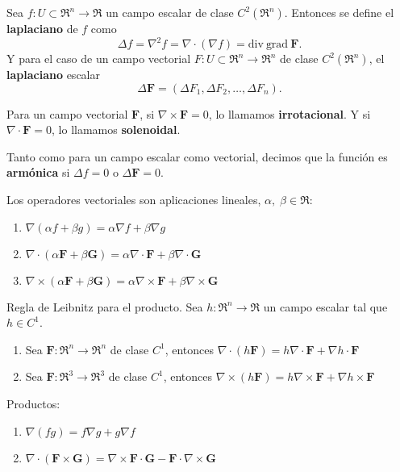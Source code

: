 \begin{definition}
    Sea $f:U\subset\Re^n\to\Re$ un campo escalar de clase $C^2(\Re^n)$. Entonces se define el \textbf{laplaciano} de $f$ como
    \[
        \Delta f=\nabla^2f=\nabla\cdot(\nabla f)=\text{div}\:\text{grad}\:\mathbf{F}.  
    \]
    Y para el caso de un campo vectorial $F:U\subset\Re^n\to\Re^n$ de clase $C^2(\Re^n)$, el \textbf{laplaciano} escalar
    \[
        \Delta\mathbf{F}=(\Delta F_1,\Delta F_2,\ldots,\Delta F_n).  
    \]
\end{definition}
\begin{definition}
    Para un campo vectorial $\mathbf{F}$, si $\nabla\times\mathbf{F}=0$, lo llamamos \textbf{irrotacional}. Y si $\nabla\cdot\mathbf{F}=0$, lo llamamos \textbf{solenoidal}.
\end{definition}
\begin{definition}
    Tanto como para un campo escalar como vectorial, decimos que la funci\'on es \textbf{arm\'onica} si $\Delta f=0$ o $\Delta \mathbf{F}=0$.
\end{definition}
\begin{propertie}
    Los operadores vectoriales son aplicaciones lineales, $\alpha,\;\beta\in\Re$:
    \begin{enumerate}
        \item \(\nabla(\alpha f+\beta g)=\alpha\nabla f+\beta\nabla g\)
        \item \(\nabla\cdot(\alpha \mathbf{F}+\beta \mathbf{G})=\alpha\nabla\cdot\mathbf{F}+\beta\nabla\cdot\mathbf{G}\)
        \item \(\nabla\times(\alpha \mathbf{F}+\beta \mathbf{G})=\alpha\nabla\times\mathbf{F}+\beta\nabla\times\mathbf{G}\)
    \end{enumerate}
\end{propertie}
\begin{propertie}
    Regla de Leibnitz para el producto. Sea $h:\Re^n\to\Re$ un campo escalar tal que $h\in C^1$.
    \begin{enumerate}
        \item Sea $\mathbf{F}:\Re^n\to\Re^n$ de clase $C^1$, entonces $\nabla\cdot(h\mathbf{F})=h\nabla\cdot\mathbf{F}+\nabla h\cdot\mathbf{F}$
        \item Sea $\mathbf{F}:\Re^3\to\Re^3$ de clase $C^1$, entonces $\nabla\times(h\mathbf{F})=h\nabla\times\mathbf{F}+\nabla h\times\mathbf{F}$
    \end{enumerate}
\end{propertie}
\begin{propertie}
    Productos:
    \begin{enumerate}
        \item $\nabla(fg)=f\nabla g+g\nabla f$
        \item $\nabla\cdot(\mathbf{F}\times\mathbf{G})=\nabla\times\mathbf{F}\cdot\mathbf{G}-\mathbf{F}\cdot\nabla\times\mathbf{G}$
    \end{enumerate}
\end{propertie}